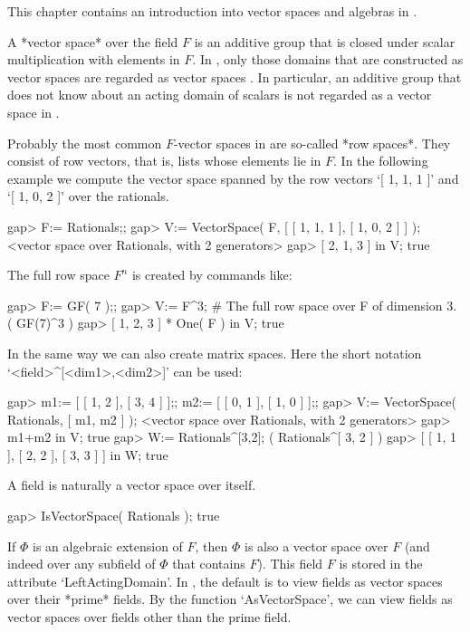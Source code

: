 
This chapter contains an introduction into vector spaces and
algebras in {\GAP}.


A *vector space* over the field $F$ is an additive group that is closed
under scalar multiplication with elements in $F$.
In {\GAP}, only those domains that are
constructed as vector spaces are regarded as vector spaces .
In particular, an additive group that does not know about an
acting domain of scalars is not regarded as a vector space in {\GAP}.

Probably the most common $F$-vector spaces in {\GAP} are so-called
*row spaces*.
They consist of row vectors, that is, lists whose elements lie in $F$.
In the following example we compute the vector space spanned by the
row vectors `[ 1, 1, 1 ]' and `[ 1, 0, 2 ]' over the rationals.

\beginexample
gap> F:= Rationals;;
gap> V:= VectorSpace( F, [ [ 1, 1, 1 ], [ 1, 0, 2 ] ] );
<vector space over Rationals, with 2 generators>
gap> [ 2, 1, 3 ] in V;
true
\endexample

The full row space $F^n$ is created by commands like:

\beginexample
gap> F:= GF( 7 );;
gap> V:= F^3;   # The full row space over F of dimension 3. 
( GF(7)^3 )
gap> [ 1, 2, 3 ] * One( F ) in V;  
true
\endexample

In the same way we can also create matrix spaces. Here the short notation
`<field>^[<dim1>,<dim2>]' can be used:

\beginexample
gap> m1:= [ [ 1, 2 ], [ 3, 4 ] ];; m2:= [ [ 0, 1 ], [ 1, 0 ] ];;
gap> V:= VectorSpace( Rationals, [ m1, m2 ] );
<vector space over Rationals, with 2 generators>
gap> m1+m2 in V;
true
gap> W:= Rationals^[3,2];
( Rationals^[ 3, 2 ] )
gap> [ [ 1, 1 ], [ 2, 2 ], [ 3, 3 ] ] in W;
true
\endexample

A field is naturally a vector space over itself. 

\beginexample
gap> IsVectorSpace( Rationals );
true
\endexample

If $\Phi$ is an algebraic extension of $F$, then $\Phi$ is
also a vector space over $F$ (and indeed over any subfield of $\Phi$
that contains $F$). This field $F$ is stored in the attribute
`LeftActingDomain'.
In {\GAP}, the default is to view fields as vector spaces
over their *prime* fields.
By the function `AsVectorSpace', we can view fields
as vector spaces over fields other than the prime field.

